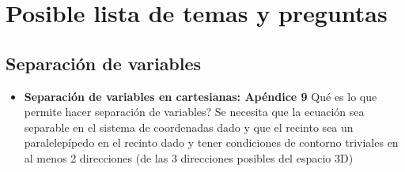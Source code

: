 \section*{Posible lista de temas y preguntas}
\subsection*{Separación de variables}
\begin{itemize}
    \item \textbf{Separación de variables en cartesianas: Apéndice 9} Qué es lo que permite hacer separación de variables? Se necesita que la ecuación sea separable en el sistema de coordenadas dado y que el recinto sea un paralelepípedo en el recinto dado y tener condiciones de contorno triviales en al menos 2 direcciones (de las 3 direcciones posibles del espacio 3D)
\end{itemize}

